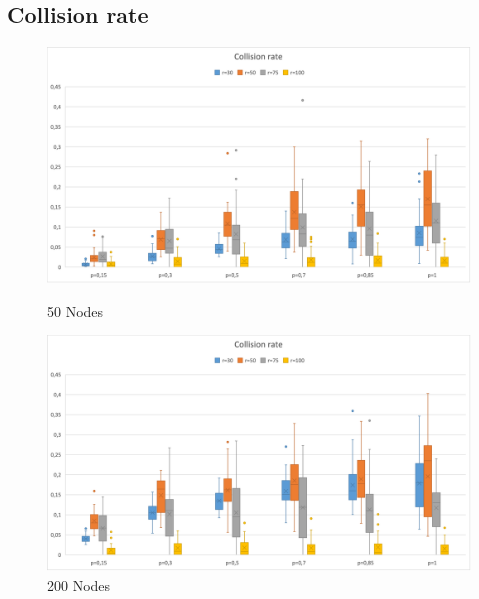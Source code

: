 \subsection{Collision rate}
\begin{figure}[H]
  \includegraphics[width=\linewidth]{./images/Collision50Boxplot.png}
  \caption{50 Nodes}\label{fig:awesome_image1}
\endminipage\hfill
{}
  \includegraphics[width=\linewidth]{./images/Collision200Boxplot.png}
  \caption{200 Nodes}\label{fig:awesome_image2}
\endminipage
\end{figure}

